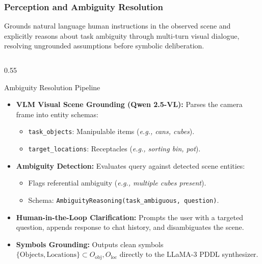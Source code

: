 \documentclass[10pt]{beamer}
\begin{document}
\begin{frame}[t]
\frametitle{Perception and Ambiguity Resolution}
\footnotesize
Grounds natural language human instructions in the observed scene and explicitly reasons about task ambiguity through multi-turn visual dialogue, resolving ungrounded assumptions before symbolic deliberation.

\vspace{0.1cm}
\begin{columns}[T]
    \begin{column}{0.55\textwidth}
        \begin{block}{Ambiguity Resolution Pipeline}
            \begin{itemize}\scriptsize
                \item \textbf{VLM Visual Scene Grounding (Qwen 2.5-VL):}
                Parses the camera frame into entity schemas:
                \begin{itemize}\tiny
                    \item \texttt{task\_objects}: Manipulable items (\textit{e.g., cans, cubes}).
                    \item \texttt{target\_locations}: Receptacles (\textit{e.g., sorting bin, pot}).
                \end{itemize}
                
                \item \textbf{Ambiguity Detection:}
                Evaluates query against detected scene entities:
                \begin{itemize}\tiny
                    \item Flags referential ambiguity (\textit{e.g., multiple cubes present}).
                    \item Schema: \texttt{AmbiguityReasoning(task\_ambiguous, question)}.
                \end{itemize}

                \item \textbf{Human-in-the-Loop Clarification:}
                Prompts the user with a targeted question, appends response to chat history, and disambiguates the scene.

                \item \textbf{Symbols Grounding:}
                Outputs clean symbols $\{\text{Objects}, \text{Locations}\} \subset O_{\text{obj}}, O_{\text{loc}}$ directly to the LLaMA-3 PDDL synthesizer.
            \end{itemize}
        \end{block}
    \end{column}


\end{columns}
\end{frame}
\end{document}
